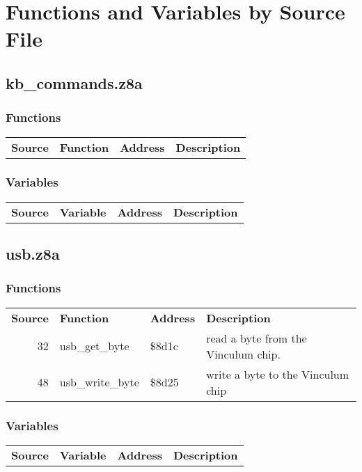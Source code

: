\section{Functions and Variables by Source File}
\subsection{kb\_commands.z8a}
\subsubsection{Functions}
\begin{tabular}{rllp{7cm}}
 \textbf{Source}&\textbf{Function}&\textbf{Address}&\textbf{Description}\\
\end{tabular}

\subsubsection{Variables}
\begin{tabular}{rllp{7cm}}
 \textbf{Source}&\textbf{Variable}&\textbf{Address}&\textbf{Description}\\
\end{tabular}

\subsection{usb.z8a}
\subsubsection{Functions}
\begin{tabular}{rllp{7cm}}
 \textbf{Source}&\textbf{Function}&\textbf{Address}&\textbf{Description}\\
 32&usb\_get\_byte&\$8d1c&read a byte from the Vinculum chip.\\
 48&usb\_write\_byte&\$8d25&write a byte to the Vinculum chip\\
\end{tabular}

\subsubsection{Variables}
\begin{tabular}{rllp{7cm}}
 \textbf{Source}&\textbf{Variable}&\textbf{Address}&\textbf{Description}\\
\end{tabular}

